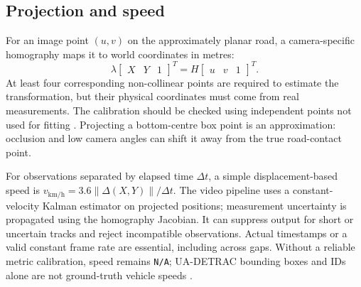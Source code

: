 \subsection{Projection and speed}
For an image point $(u,v)$ on the approximately planar road, a camera-specific homography maps it to world coordinates in metres:
\begin{equation}
\lambda\begin{bmatrix} X & Y & 1 \end{bmatrix}^{\!T} =
H\begin{bmatrix} u & v & 1 \end{bmatrix}^{\!T}.
\end{equation}
At least four corresponding non-collinear points are required to estimate the transformation, but their physical coordinates must come from real measurements. The calibration should be checked using independent points not used for fitting \cite{opencvhomography}. Projecting a bottom-centre box point is an approximation: occlusion and low camera angles can shift it away from the true road-contact point.

For observations separated by elapsed time $\Delta t$, a simple displacement-based speed is $v_{\mathrm{km/h}}=3.6\lVert\Delta(X,Y)\rVert/\Delta t$. The video pipeline uses a constant-velocity Kalman estimator on projected positions; measurement uncertainty is propagated using the homography Jacobian. It can suppress output for short or uncertain tracks and reject incompatible observations. Actual timestamps or a valid constant frame rate are essential, including across gaps. Without a reliable metric calibration, speed remains \texttt{N/A}; UA-DETRAC bounding boxes and IDs alone are not ground-truth vehicle speeds \cite{architecture}.
